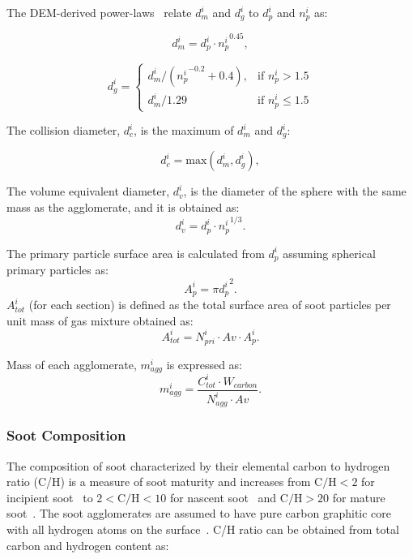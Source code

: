 The DEM-derived power-laws~\citep{Kelesidis2017} relate ${d^i_m}$ and ${d^i_g}$ to ${d^i_p}$ and ${n^i_p}$ as:

\begin{equation}
	d^i_{m} = d^i_p\cdot {n^i_p}^{0.45}
	\label{eqn:d_m},
\end{equation}

\begin{equation}
	d^i_g = 
	\left\{
	\begin{array}{lr}
		d^i_m/({n^i_p}^{-0.2}+0.4), & \text{if } n^i_p > 1.5\\
		d^i_m/1.29 & \text{if } n^i_p\leq 1.5
	\end{array}
	\right.
	\label{eqn:d_g}
\end{equation}

The collision diameter, ${d^i_c}$, is the maximum of ${d^i_{m}}$ and ${d^i_{g}}$:

\begin{equation}
	d^i_c = \mathrm{max}\left(d^i_m, d^i_g\right),
	\label{eqn:d_c}
\end{equation}

The volume equivalent diameter, $d^i_v$, is the diameter of the sphere with the same mass as the agglomerate, and it is obtained as:
\begin{equation}
	d^i_v = d^i_p \cdot {n^i_p}^{1/3}.
	\label{eqn:d_v}
\end{equation}

The primary particle surface area is calculated from ${d^i_p}$ assuming spherical primary particles as:
\begin{equation}
	A^i_{p} = \pi {d^i_p}^2.
	\label{eqn:Ap}
\end{equation}
$A^i_{tot}$ (for each section) is defined as the total surface area of soot particles per unit mass of gas mixture obtained as:
\begin{equation}
	A^i_{tot} = N^i_{pri}\cdot Av\cdot A^i_{p}
	\label{eqn:Atot}.
\end{equation}

Mass of each agglomerate, $m^i_{agg}$ is expressed as:
\begin{equation}
	m^i_{agg} = \frac{C^i_{tot}\cdot W_{carbon}}{N^i_{agg}\cdot Av}.
	\label{eqn:m_agg}
\end{equation}


\subsubsection{Soot Composition}
\label{sec:sootcomp}
The composition of soot characterized by their elemental carbon to hydrogen ratio (C/H) is a measure of soot maturity and increases from $\mathrm{C/H<2}$ for incipient soot~\citep{ciajolo1998spectroscopic} to $\mathrm{2<C/H<10}$ for nascent soot~\citep{betrancourt2017investigation} and $\mathrm{C/H>20}$ for mature soot~\citep{michelsen2017probing}. The soot agglomerates are assumed to have pure carbon graphitic core~\citep{kholghy2016core} with all hydrogen atoms on the surface~\citep{blanquart2009analyzing}. C/H ratio can be obtained from total carbon and hydrogen content as:

